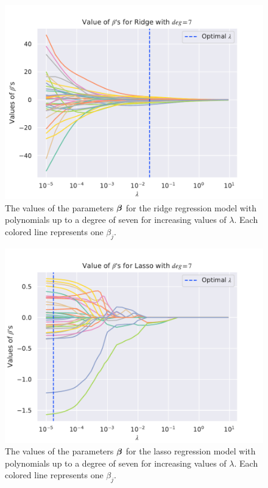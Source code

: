 \begin{figure}[h!]
    \centering
    \includegraphics[width=1\linewidth]{project_1/figures/figures_in_report/Ridge_Betas_lambda_Franke_Noise_const_deg.pdf}
    \caption{The values of the parameters $\boldsymbol{\beta}$ for the ridge regression model with polynomials up to a degree of seven for increasing values of $\lambda$. Each colored line represents one $\beta_j$.}
    \label{fig:ridge_betas}
\end{figure}

\begin{figure}[h!]
    \centering
    \includegraphics[width=1\linewidth]{project_1/figures/figures_in_report/lasso_Betas_lambda_Franke_Noise_const_deg.pdf}
    \caption{The values of the parameters $\boldsymbol{\beta}$ for the lasso regression model with polynomials up to a degree of seven for increasing values of $\lambda$. Each colored line represents one $\beta_j$.}
    \label{fig:lasso_betas}
\end{figure}


